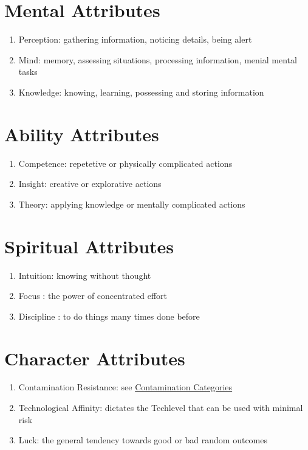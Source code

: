 \section{Mental Attributes}\label{sec:mental-attributes}
\begin{enumerate}[label=-]
    \item {Perception}: gathering information, noticing details, being alert
    \item {Mind}: memory, assessing situations, processing information, menial mental tasks
    \item {Knowledge}: knowing, learning, possessing and storing information
\end{enumerate}
\section{Ability Attributes}\label{sec:ability-attributes}
\begin{enumerate}[label= -]
    \item {Competence}: repetetive or physically complicated actions
    \item {Insight}: creative or explorative actions
    \item {Theory}: applying knowledge or mentally complicated actions
\end{enumerate}
\section{Spiritual Attributes}\label{sec:spiritual-attributes}
\begin{enumerate}[label= -]
    \item {Intuition}\label{itm:intuition}: knowing without thought
    \item {Focus} \label{itm:focus}: the power of concentrated effort
    \item {Discipline} \label{itm:discipline}: to do things many times done before
\end{enumerate}
\section{Character Attributes}\label{sec:character-attributes}
\begin{enumerate}[label= -]
    \item {Contamination Resistance}: see \hyperref[subsec:categories]{Contamination Categories}
    \item {Technological Affinity}: dictates the Techlevel that can be used with minimal risk
    \item {Luck}: the general tendency towards good or bad random outcomes
\end{enumerate}
